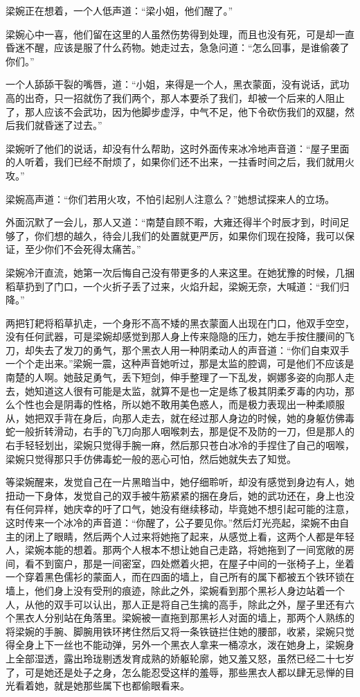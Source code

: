 梁婉正在想着，一个人低声道：“梁小姐，他们醒了。”

梁婉心中一喜，他们留在这里的人虽然伤势得到处理，而且也没有死，可是却一直昏迷不醒，应该是服了什么药物。她走过去，急急问道：“怎么回事，是谁偷袭了你们。”

一个人舔舔干裂的嘴唇，道：“小姐，来得是一个人，黑衣蒙面，没有说话，武功高的出奇，只一招就伤了我们两个，那人本要杀了我们，却被一个后来的人阻止了，那人应该不会武功，因为他脚步虚浮，中气不足，他下令砍伤我们的双腿，然后我们就昏迷了过去。”

梁婉听了他们的说话，却没有什么帮助，这时外面传来冰冷地声音道：“屋子里面的人听着，我们已经不耐烦了，如果你们还不出来，一拄香时间之后，我们就用火攻。”

梁婉高声道：“你们若用火攻，不怕引起别人注意么？”她想试探来人的立场。

外面沉默了一会儿，那人又道：“南楚自顾不暇，大雍还得半个时辰才到，时间足够了，你们想的越久，待会儿我们的处置就更严厉，如果你们现在投降，我可以保证，至少你们不会死得太痛苦。”

梁婉冷汗直流，她第一次后悔自己没有带更多的人来这里。在她犹豫的时候，几捆稻草扔到了门口，一个火折子丢了过来，火焰升起，梁婉无奈，大喊道：“我们归降。”

两把钉耙将稻草扒走，一个身形不高不矮的黑衣蒙面人出现在门口，他双手空空，没有任何武器，可是梁婉却感觉到那人身上传来隐隐的压力，她左手按住腰间的飞刀，却失去了发刀的勇气，那个黑衣人用一种阴柔动人的声音道：“你们自束双手一个个走出来。”梁婉一震，这种声音她听过，那是太监的腔调，可是他们不应该是南楚的人啊。她鼓足勇气，丢下短剑，伸手整理了一下乱发，婀娜多姿的向那人走去，她知道这人很有可能是太监，就算不是也一定是练了极其阴柔歹毒的内功，那么个性也会是阴毒的性格，所以她不敢用美色惑人，而是极力表现出一种柔顺服从，她把双手背在身后，向那人走去，就在经过那人身边的时候，她的身躯仿佛毒蛇一般折转滑动，右手的飞刀向那人咽喉刺去，那是促不及防的一刀，但是那人的右手轻轻划出，梁婉只觉得手腕一麻，然后那只苍白冰冷的手捏住了自己的咽喉，梁婉只觉得那只手仿佛毒蛇一般的恶心可怕，然后她就失去了知觉。

等梁婉醒来，发觉自己在一片黑暗当中，她仔细聆听，却没有感觉到身边有人，她扭动一下身体，发觉自己的双手被牛筋紧紧的捆在身后，她的武功还在，身上也没有任何异样，她庆幸的吁了口气，她没有继续移动，毕竟她不想引起可能的注意，这时传来一个冰冷的声音道：“你醒了，公子要见你。”然后灯光亮起，梁婉不由自主的闭上了眼睛，然后两个人过来将她拖了起来，从感觉上看，这两个人都是年轻人，梁婉本能的想着。那两个人根本不想让她自己走路，将她拖到了一间宽敞的房间，看不到窗户，那是一间密室，四处燃着火把，在屋子中间的一张椅子上，坐着一个穿着黑色儒衫的蒙面人，而在四面的墙上，自己所有的属下都被五个铁环锁在墙上，他们身上没有受刑的痕迹，除此之外，梁婉看到那个黑衫人身边站着一个人，从他的双手可以认出，那人正是将自己生擒的高手，除此之外，屋子里还有六个黑衣人分别站在角落里。梁婉被一直拖到那黑衫人对面的墙上，那两个人熟练的将梁婉的手腕、脚腕用铁环拷住然后又将一条铁链拦住她的腰部，收紧，梁婉只觉得全身上下一丝也不能动弹，另外一个黑衣人拿来一桶凉水，泼在她身上，梁婉身上全部湿透，露出玲珑剔透发育成熟的娇躯轮廓，她又羞又怒，虽然已经二十七岁了，可是她还是处子之身，怎么能忍受这样的羞辱，那些黑衣人都以肆无忌惮的目光看着她，就是她那些属下也都偷眼看来。

